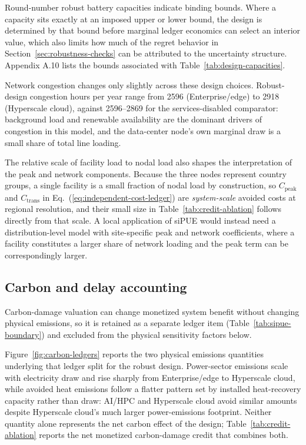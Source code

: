 \documentclass[preprint,12pt]{elsarticle}
\begin{document}
Round-number robust battery capacities indicate binding bounds. Where a capacity sits exactly at an imposed upper or lower bound, the design is determined by that bound before marginal ledger economics can select an interior value, which also limits how much of the regret behavior in Section~\ref{sec:robustness-checks} can be attributed to the uncertainty structure. Appendix A.10 lists the bounds associated with Table~\ref{tab:design-capacities}.

Network congestion changes only slightly across these design choices. Robust-design congestion hours per year range from 2596 (Enterprise/edge) to 2918 (Hyperscale cloud), against 2596--2869 for the services-disabled comparator: background load and renewable availability are the dominant drivers of congestion in this model, and the data-center node's own marginal draw is a small share of total line loading.

The relative scale of facility load to nodal load also shapes the interpretation of the peak and network components. Because the three nodes represent country groups, a single facility is a small fraction of nodal load by construction, so $C_{\text{peak}}$ and $C_{\text{trans}}$ in Eq.~(\ref{eq:independent-cost-ledger}) are \emph{system-scale} avoided costs at regional resolution, and their small size in Table~\ref{tab:credit-ablation} follows directly from that scale. A local application of siPUE would instead need a distribution-level model with site-specific peak and network coefficients, where a facility constitutes a larger share of network loading and the peak term can be correspondingly larger.


\subsection{Carbon and delay accounting}

Carbon-damage valuation can change monetized system benefit without changing physical emissions, so it is retained as a separate ledger item (Table~\ref{tab:sipue-boundary}) and excluded from the physical sensitivity factors below.

Figure~\ref{fig:carbon-ledgers} reports the two physical emissions quantities underlying that ledger split for the robust design. Power-sector emissions scale with electricity draw and rise sharply from Enterprise/edge to Hyperscale cloud, while avoided heat emissions follow a flatter pattern set by installed heat-recovery capacity rather than draw: AI/HPC and Hyperscale cloud avoid similar amounts despite Hyperscale cloud's much larger power-emissions footprint. Neither quantity alone represents the net carbon effect of the design; Table~\ref{tab:credit-ablation} reports the net monetized carbon-damage credit that combines both.
\end{document}
